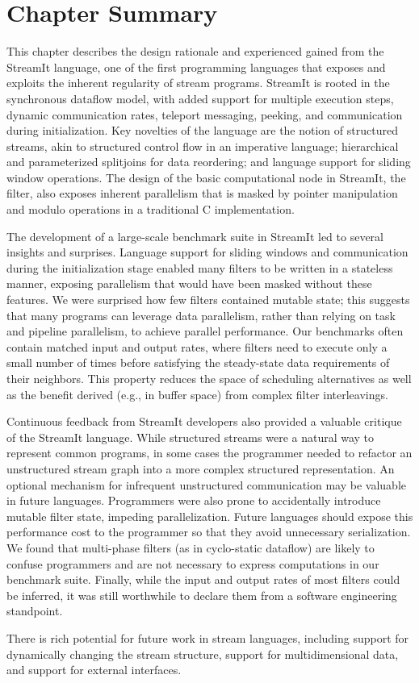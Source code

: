 \myend

\section{Chapter Summary}

This chapter describes the design rationale and experienced gained
from the StreamIt language, one of the first programming languages
that exposes and exploits the inherent regularity of stream programs.
StreamIt is rooted in the synchronous dataflow model, with added
support for multiple execution steps, dynamic communication rates,
teleport messaging, peeking, and communication during initialization.
Key novelties of the language are the notion of structured streams,
akin to structured control flow in an imperative language;
hierarchical and parameterized splitjoins for data reordering; and
language support for sliding window operations.  The design of the
basic computational node in StreamIt, the filter, also exposes
inherent parallelism that is masked by pointer manipulation and modulo
operations in a traditional C implementation.

The development of a large-scale benchmark suite in StreamIt led to
several insights and surprises.  Language support for sliding windows
and communication during the initialization stage enabled many filters
to be written in a stateless manner, exposing parallelism that would
have been masked without these features.  We were surprised how few
filters contained mutable state; this suggests that many programs can
leverage data parallelism, rather than relying on task and pipeline
parallelism, to achieve parallel performance.  Our benchmarks often
contain matched input and output rates, where filters need to execute
only a small number of times before satisfying the steady-state data
requirements of their neighbors.  This property reduces the space of
scheduling alternatives as well as the benefit derived (e.g., in
buffer space) from complex filter interleavings.

Continuous feedback from StreamIt developers also provided a valuable
critique of the StreamIt language.  While structured streams were a
natural way to represent common programs, in some cases the programmer
needed to refactor an unstructured stream graph into a more complex
structured representation.  An optional mechanism for infrequent
unstructured communication may be valuable in future languages.
Programmers were also prone to accidentally introduce mutable filter
state, impeding parallelization.  Future languages should expose this
performance cost to the programmer so that they avoid unnecessary
serialization.  We found that multi-phase filters (as in cyclo-static
dataflow) are likely to confuse programmers and are not necessary to
express computations in our benchmark suite.  Finally, while the input
and output rates of most filters could be inferred, it was still
worthwhile to declare them from a software engineering standpoint.

There is rich potential for future work in stream languages, including
support for dynamically changing the stream structure, support for
multidimensional data, and support for external interfaces.
